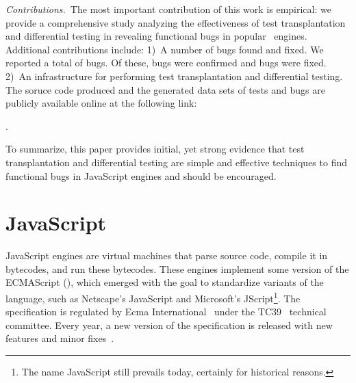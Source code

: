 \documentclass[smallextended]{svjour3}
\begin{document}
\emph{Contributions.}~The most important contribution of this work is
empirical: we provide a comprehensive study analyzing the
effectiveness of test transplantation and differential testing in
revealing functional bugs in popular \javascript\ engines.  Additional
contributions include: 1)~A number of bugs found and fixed.  We
reported a total of \totalBugsReported bugs.  Of these,
\totalBugsConfirmed bugs were confirmed and \totalBugsFixed bugs were
fixed.  2)~An infrastructure for performing test transplantation and
differential testing. The soruce code produced and the generated data sets of tests
and bugs are publicly available online at the following link:

\dataRepo.

\vspace{1ex} To summarize, this paper provides initial, yet strong
evidence that test transplantation and differential testing are simple
and effective techniques to find functional bugs in JavaScript engines
and should be encouraged.

\section{JavaScript}
\label{sec:es6-design}
\label{sec:imp-dep-behavior}

JavaScript engines are virtual machines that parse source code,
compile it in bytecodes, and run these bytecodes. These engines
implement some version of the ECMAScript (\es{}), which emerged with
the goal to standardize variants of the language, such as Netscape's
JavaScript and Microsoft's JScript\footnote{The name JavaScript still
  prevails today, certainly for historical reasons.}. The \es{}
specification is regulated by Ecma International~\cite{es6-website}
under the TC39~\cite{tc39-github} technical committee.  Every year, a
new version of the \es{} specification is released with new features
and minor fixes~\cite{ecmas262-spec-repo,ecmas262-spec}.

\end{document}
